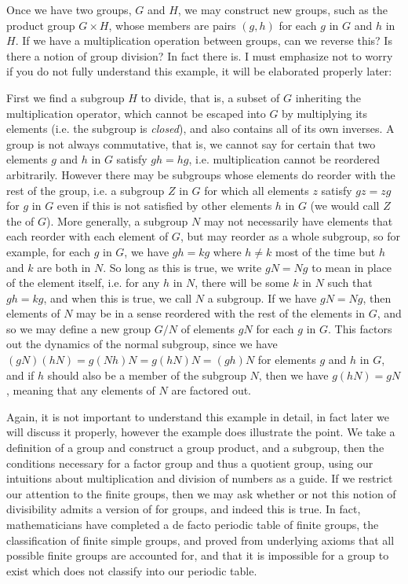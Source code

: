 \documentclass[11pt]{article}
\begin{document}
Once we have two groups, $G$ and $H$, we may construct new groups, such as the product group $G \times H$, whose members are pairs $(g,h)$ for each $g$ in $G$ and $h$ in $H$. If we have a multiplication operation between groups, can we reverse this? Is there a notion of group division? In fact there is. I must emphasize not to worry if you do not fully understand this example, it will be elaborated properly later:

First we find a subgroup $H$ to divide, that is, a subset of $G$ inheriting the multiplication operator, which cannot be escaped into $G$ by multiplying its elements (i.e. the subgroup is \emph{closed}), and also contains all of its own inverses. A group is not always commutative, that is, we cannot say for certain that two elements $g$ and $h$ in $G$ satisfy $g h = h g$, i.e. multiplication cannot be reordered arbitrarily. However there may be subgroups whose elements do reorder with the rest of the group, i.e. a subgroup $Z$ in $G$ for which all elements $z$ satisfy $g z = z g$ for $g$ in $G$ even if this is not satisfied by other elements $h$ in $G$ (we would call $Z$ the  of $G$). More generally, a subgroup $N$ may not necessarily have elements that each reorder with each element of $G$, but may reorder as a whole subgroup, so for example, for each $g$ in $G$, we have $g h = k g$ where $h \neq k$ most of the time but $h$ and $k$ are both in $N$. So long as this is true, we write $g N = N g$ to mean  in place of the element itself, i.e. for any $h$ in $N$, there will be some $k$ in $N$ such that $g h = k g$, and when this is true, we call $N$ a  subgroup. If we have $g N = N g$, then elements of $N$ may be in a sense reordered with the rest of the elements in $G$, and so we may define a new group $G/N$ of elements $g N$ for each $g$ in $G$. This  factors out the dynamics of the normal subgroup, since we have $(g N) (h N) = g (N h) N = g (h N) N = (g h) N$ for elements $g$ and $h$ in $G$, and if $h$ should also be a member of the subgroup $N$, then we have $g (h N) = g N$, meaning that any elements of $N$ are factored out.

Again, it is not important to understand this example in detail, in fact later we will discuss it properly, however the example does illustrate the point. We take a definition of a group and construct a group product, and a subgroup, then the conditions necessary for a factor group and thus a quotient group, using our intuitions about multiplication and division of numbers as a guide. If we restrict our attention to the finite groups, then we may ask whether or not this notion of divisibility admits a version of  for groups, and indeed this is true. In fact, mathematicians have completed a de facto periodic table of finite groups, the classification of finite simple groups, and proved from underlying axioms that all possible finite groups are accounted for, and that it is impossible for a group to exist which does not classify into our periodic table.
\end{document}

